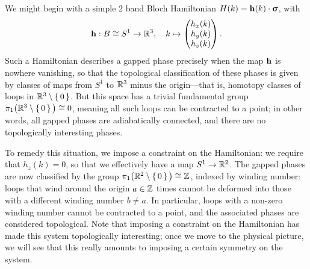 We might begin with a simple 2 band Bloch Hamiltonian $H(k) = \vb{h}(k)\cdot\bm{\upsigma}$, with
\[
	\vb{h}: B\cong S^1\to\mathbb{R}^3,\quad k\mapsto\begin{pmatrix}
		h_x(k) \\ h_y(k) \\ h_z(k)
	\end{pmatrix}.
\]
Such a Hamiltonian describes a gapped phase precisely when the map $\vb{h}$ is nowhere vanishing, so that the topological classification of these phases is given by classes of maps from $S^1$ to $\mathbb{R}^3$ minus the origin---that is, homotopy classes of loops in $\mathbb{R}^3\setminus\set{0}$. But this space has a trivial fundamental group $\pi_1\big(\mathbb{R}^3\setminus\set{0}\big)\cong0$, meaning all such loops can be contracted to a point; in other words, all gapped phases are adiabatically connected, and there are no topologically interesting phases.

To remedy this situation, we impose a constraint on the Hamiltonian: we require that $h_z(k)=0$, so that we effectively have a map $S^1\to\mathbb{R}^2$. The gapped phases are now classified by the group $\pi_1\big(\mathbb{R}^2\setminus\set{0}\big)\cong\mathbb{Z}$, indexed by winding number: loops that wind around the origin $a\in\mathbb{Z}$ times cannot be deformed into those with a different winding number $b\neq a$. In particular, loops with a non-zero winding number cannot be contracted to a point, and the associated phases are considered topological. Note that imposing a constraint on the Hamiltonian has made this system topologically interesting; once we move to the physical picture, we will see that this really amounts to imposing a certain symmetry on the system.

